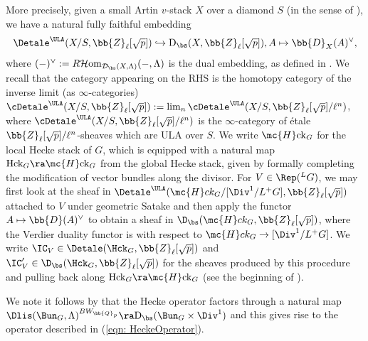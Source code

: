 \documentclass[letterpaper,11pt]{amsart}
\begin{document}
More precisely, given a small Artin $v$-stack $X$ over a diamond $S$ (in the sense of \cite[Section~IV.1]{FSGeomLLC}), we have a natural fully faithful embedding 
\begin{equation}{\label{eqn: dualembedding}}
 \Detale^{\ULA}(X/S,\bb{Z}_{\ell}[\sqrt{p}]) \hookrightarrow \mathrm{D}_{\bs}(X,\bb{Z}_{\ell}[\sqrt{p}]),  \\
 A \mapsto \bb{D}_{X}(A)^{\vee}, 
\end{equation}
where $(-)^{\vee} := R\mathcal{H}\mathrm{om}_{\mathcal{D}_{\bs}(X,\Lambda)}(-,\Lambda)$ is the dual embedding, as defined in \cite[Section~VII.5]{FSGeomLLC}. We recall that the category appearing on the RHS is the homotopy category of the inverse limit (as $\infty$-categories) $\cDetale^{\ULA}(X/S,\bb{Z}_{\ell}[\sqrt{p}]) := \lim_{n} \cDetale^{\ULA}(X/S,\bb{Z}_{\ell}[\sqrt{p}]/\ell^{n})$, where $\cDetale^{\ULA}(X/S,\bb{Z}_{\ell}[\sqrt{p}]/\ell^{n})$ is the $\infty$-category of \'etale $\bb{Z}_{\ell}[\sqrt{p}]/\ell^{n}$-sheaves which are ULA over $S$. We write $\mc{H}\mathrm{ck}_{G}$ for the local Hecke stack of $G$, which is equipped with a natural map $\mathrm{Hck}_{G} \ra \mc{H}\mathrm{ck}_{G}$ from the global Hecke stack, given by formally completing the modification of vector bundles along the divisor. For $V \in \Rep(\phantom{}^{L}G)$, we may first look at the sheaf in $\Detale^{\ULA}(\mc{H}ck_{G}/[\Div^{1}/L^{+}G],\bb{Z}_{\ell}[\sqrt{p}])$ attached to $V$ under geometric Satake and then apply the functor $A\mapsto \bb{D}(A)^\vee$ to obtain a sheaf in $\D_{\bs}(\mc{H}ck_{G},\bb{Z}_{\ell}[\sqrt{p}])$, where the Verdier duality functor is with respect to $\mc{H}ck_{G}\to[\Div^{1}/L^{+}G]$. We write $\IC_{V} \in \Detale(\Hck_{G},\bb{Z}_{\ell}[\sqrt{p}])$ and $\IC'_{V} \in \D_{\bs}(\Hck_{G},\bb{Z}_{\ell}[\sqrt{p}])$ for the sheaves produced by this procedure and pulling back along $\mathrm{Hck}_{G} \ra \mc{H}\mathrm{ck}_{G}$ (see the beginning of \cite[Section~IX.2]{FSGeomLLC}).

We note it follows by \cite[Proposition~IX.2.1]{FSGeomLLC} that the Hecke operator factors through a natural map $\Dlis(\Bun_{G},\Lambda)^{BW_{\bb{Q}_{p}}} \ra \mathrm{D}_{\bs}(\Bun_{G} \times \Div^{1})$ and this gives rise to the operator described in (\ref{eqn: HeckeOperator}).
\end{document}
